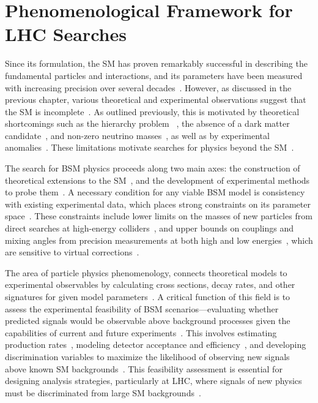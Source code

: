 \chapter[Phenomenological Framework]{Phenomenological Framework for LHC Searches }\label{ch:pheno}

Since its formulation, the SM has proven remarkably successful in describing the fundamental particles and interactions, and its parameters have been measured with increasing precision over several decades~\cite{1674-1137-40-10-100001,PhysRevLett.19.1264}. However, as discussed in the previous chapter, various theoretical and experimental observations suggest that the SM is incomplete~\cite{Nilles1984,Dorsner:2016wpm}. As outlined previously, this is motivated by theoretical shortcomings such as the hierarchy problem~\cite{Randall:1999ee,Giudice2013_review} , the absence of a dark matter candidate~\cite{Bertone2005_DM_review}, and non-zero neutrino masses~\cite{Mohapatra:1985xm}, as well as by experimental anomalies~\cite{LHCb:2014vgu,LHCb:2017avl,BaBar:2012obs}. These limitations motivate searches for physics beyond the SM~\cite{Dorsner:2016wpm,Buttazzo:2017ixm}.

The search for BSM physics proceeds along two main axes: the construction of theoretical extensions to the SM~\cite{Dorsner:2016wpm,Buttazzo:2017ixm,Giudice2013_review}, and the development of experimental methods to probe them~\cite{Alwall:2014hca,Alloul:2013bka,deFavereau:2013fsa}. A necessary condition for any viable BSM model is consistency with existing experimental data, which places strong constraints on its parameter space~\cite{1674-1137-40-10-100001,ATLAS:2019erb,CMS:2021ctt}. These constraints include lower limits on the masses of new particles from direct searches at high-energy colliders~\cite{ATLAS:2019erb,CMS:2021ctt}, and upper bounds on couplings and mixing angles from precision measurements at both high and low energies~\cite{Schael_2006,Altmannshofer_2015}, which are sensitive to virtual corrections~\cite{Ciuchini:2022wbq}.


The area of particle physics phenomenology,  connects theoretical models to experimental observables by calculating cross sections, decay rates, and other signatures for given model parameters~\cite{Alwall:2014hca,Sjostrand:2014zea,Cacciari:2011ma}. A critical function of this field is to assess the experimental feasibility of BSM scenarios—evaluating whether predicted signals would be observable above background processes given the capabilities of current and future experiments~\cite{deFavereau:2013fsa,Alwall:2014hca,Alloul:2013bka}. This involves estimating production rates~\cite{Alwall:2014hca,Sjostrand:2014zea,NNPDF:2014otw}, modeling detector acceptance and efficiency~\cite{deFavereau:2013fsa,ATLAS:2008xda,CMS:2008xjf,lumiRef}, and developing discrimination variables to maximize the likelihood of observing new signals above known SM backgrounds~\cite{pedregosa_scikit-learn_2011,Chen2016,Bols_2020,CMS_DeepTau}. This feasibility assessment is essential for designing analysis strategies, particularly at LHC, where signals of new physics must be discriminated from large SM backgrounds~\cite{deFavereau:2013fsa,Alwall:2014hca,Evans_2008,ATLAS:2008xda,CMS:2008xjf}.

